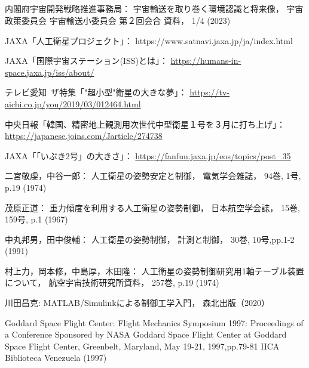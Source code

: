 \begin{center}
\section*{}                      %
\vspace*{-2zh}
\end{center}

\begin{thebibliography}{99}
	内閣府宇宙開発戦略推進事務局：
	宇宙輸送を取り巻く環境認識と将来像，
	宇宙政策委員会 宇宙輸送小委員会 第２回会合 資料，
	1/4 (2023)

	JAXA「人工衛星プロジェクト」：
	https://www.satnavi.jaxa.jp/ja/index.html

	JAXA「国際宇宙ステーション(ISS)とは」：
	\url{https://humans-in-space.jaxa.jp/iss/about/}

	テレビ愛知~ザ特集「"超小型"衛星の大きな夢」：
	\url{https://tv-aichi.co.jp/you/2019/03/012464.html}

	中央日報「韓国、精密地上観測用次世代中型衛星１号を３月に打ち上げ」：
	\url{https://japanese.joins.com/Jarticle/274738}
	
	JAXA「「いぶき2号」の大きさ」：
	\url{https://fanfun.jaxa.jp/eos/topics/post_35}

	二宮敬虔，中谷一郎：
	人工衛星の姿勢安定と制御，
	電気学会雑誌，
	94巻, 1号, p.19 (1974)

	茂原正道：
	重力傾度を利用する人工衛星の姿勢制御，
	日本航空学会誌，
	15巻, 159号, p.1 (1967)

	中丸邦男，田中俊輔：
	人工衛星の姿勢制御，
	計測と制御，
	30巻, 10号,pp.1-2 (1991)

	村上力，岡本修，中島厚，木田隆：
	人工衛星の姿勢制御研究用1軸テーブル装置について，
	航空宇宙技術研究所資料，
	257巻, p.19 (1974)

	川田昌克:
	MATLAB/Simulinkによる制御工学入門，
	森北出版（2020）

	Goddard Space Flight Center:
	Flight Mechanics Symposium 1997: Proceedings of a Conference Sponsored by NASA Goddard
	 Space Flight Center at Goddard Space Flight Center, Greenbelt, Maryland, May 19-21, 1997,pp.79-81
	 IICA Biblioteca Venezuela (1997)


\end{thebibliography}
